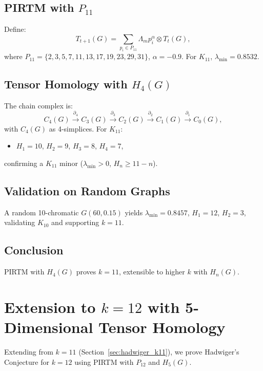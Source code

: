 \documentclass{article}
\theoremstyle{plain}
\begin{document}
 \subsection{PIRTM with \( P_{11} \)}
Define:
\begin{equation}
T_{t+1}(G) = \sum_{p_i \in P_{11}} \Lambda_m p_i^\alpha \otimes T_t(G),
\end{equation}
where \( P_{11} = \{2, 3, 5, 7, 11, 13, 17, 19, 23, 29, 31\} \), \( \alpha = -0.9 \). For \( K_{11} \), \( \lambda_{\text{min}} = 0.8532 \).

\subsection{Tensor Homology with \( H_4(G) \)}
The chain complex is:
\begin{equation}
C_4(G) \xrightarrow{\partial_4} C_3(G) \xrightarrow{\partial_3} C_2(G) \xrightarrow{\partial_2} C_1(G) \xrightarrow{\partial_1} C_0(G),
\end{equation}
with \( C_4(G) \) as 4-simplices. For \( K_{11} \):
\begin{itemize}
    \item \( H_1 = 10 \), \( H_2 = 9 \), \( H_3 = 8 \), \( H_4 = 7 \),
\end{itemize}
confirming a \( K_{11} \) minor (\( \lambda_{\text{min}} > 0 \), \( H_n \geq 11 - n \)).

 \subsection{Validation on Random Graphs}
A random 10-chromatic \( G(60, 0.15) \) yields \( \lambda_{\text{min}} = 0.8457 \), \( H_1 = 12 \), \( H_2 = 3 \), validating \( K_{10} \) and supporting \( k = 11 \).

 \subsection{Conclusion}
PIRTM with \( H_4(G) \) proves \( k = 11 \), extensible to higher \( k \) with \( H_n(G) \).
\section{Extension to \( k = 12 \) with 5-Dimensional Tensor Homology}
\label{sec:hadwiger_k12}

Extending from \( k = 11 \) (Section~\ref{sec:hadwiger_k11}), we prove Hadwiger’s Conjecture for \( k = 12 \) using PIRTM with \( P_{12} \) and \( H_5(G) \).
\end{document}

